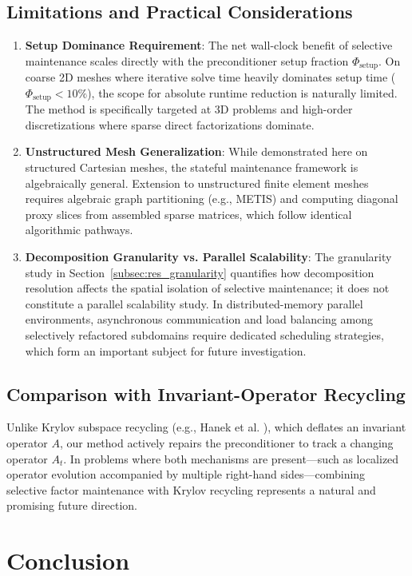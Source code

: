 \documentclass[preprint,12pt,3p]{elsarticle}
\begin{document}
\subsection{Limitations and Practical Considerations}
\begin{enumerate}
    \item \textbf{Setup Dominance Requirement}: The net wall-clock benefit of selective maintenance scales directly with the preconditioner setup fraction $\Phi_{\text{setup}}$. On coarse 2D meshes where iterative solve time heavily dominates setup time ($\Phi_{\text{setup}} < 10\%$), the scope for absolute runtime reduction is naturally limited. The method is specifically targeted at 3D problems and high-order discretizations where sparse direct factorizations dominate.
    \item \textbf{Unstructured Mesh Generalization}: While demonstrated here on structured Cartesian meshes, the stateful maintenance framework is algebraically general. Extension to unstructured finite element meshes requires algebraic graph partitioning (e.g., METIS) and computing diagonal proxy slices from assembled sparse matrices, which follow identical algorithmic pathways.
    \item \textbf{Decomposition Granularity vs. Parallel Scalability}: The granularity study in Section~\ref{subsec:res_granularity} quantifies how decomposition resolution affects the spatial isolation of selective maintenance; it does not constitute a parallel scalability study. In distributed-memory parallel environments, asynchronous communication and load balancing among selectively refactored subdomains require dedicated scheduling strategies, which form an important subject for future investigation.
\end{enumerate}

\subsection{Comparison with Invariant-Operator Recycling}
Unlike Krylov subspace recycling (e.g., Hanek et al. \cite{hanek2026recycling}), which deflates an invariant operator $A$, our method actively repairs the preconditioner to track a changing operator $A_t$. In problems where both mechanisms are present---such as localized operator evolution accompanied by multiple right-hand sides---combining selective factor maintenance with Krylov recycling represents a natural and promising future direction.

\section{Conclusion}
\label{sec:conclusion}
\end{document}
